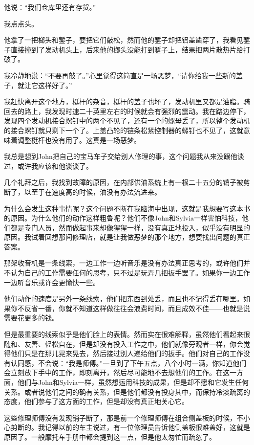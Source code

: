 \documentclass[UTF8]{article}
\begin{document}
\par 他说：“我们仓库里还有存货。”
\par 我点点头。
\par 他拿了一把榔头和錾子，要把它们敲松，然而他的錾子却把铝盖凿穿了，我看见錾子直接撞到了发动机头上，后来他的榔头没能打到錾子上，结果把两片散热片给打破了。
\par 我冷静地说：“不要再敲了。”心里觉得这简直是一场恶梦，“请你给我一些新的盖子，就让它这样好了。”
\par 我赶快离开这个地方，梃杆的杂音，梃杆的盖子也坏了，发动机里又都是油脂。骑回去的路上，我发现时速二十英里左右的时候就会有强烈的震动。我在路边停下，发现四个发动机接合螺钉中的两个不见了，还有一个的螺母丢了，所以整个发动机的接合螺钉就只剩下一个了。上盖凸轮的链条松紧控制器的螺钉也不见了，这就意味着调整梃杆也没有用了。这真是一场恶梦。
\par 我总是想到John把自己的宝马车子交给别人修理的事，这个问题我从来没跟他谈过，或许我应该和他谈谈了。
\par 几个礼拜之后，我找到故障的原因，在内部供油系统上有一根二十五分的销子被剪断了，以至于在速度高的时候，油没有办法流进来。
\par 为什么会发生这种事情呢？这个问题不断在我脑海中出现，这就是我想要写这本书的原因。为什么他们的动作这样粗鲁呢？他们不像John和Sylvia一样害怕科技，他们都是专门人员，然而做起事来却像猩猩一样，没有真正地投入，似乎没有明显的原因。我试着回想那间修理店，就是让我做恶梦的那个地方，想要找出问题的真正答案。
\par 那架收音机是一条线索，一边工作一边听音乐是没有办法真正思考的，或许他们并不认为自己的工作需要任何的思考，只不过是玩弄几把扳手罢了。如果你一边工作一边听音乐或许会更愉快一些。
\par 他们动作的速度是另外一条线索，他们把东西到处丢，而且也不记得丢在哪里。如果你不反省一番，你就不知道这样做往往会浪费时间，而且成效不佳——也就是说需要花更多的钱。
\par 但是最重要的线索似乎是他们脸上的表情。然而实在很难解释，虽然他们看起来很随和、友善、轻松自在，但是却没有投入工作之中，他们就像旁观者一样，你会觉得他们只是在那儿晃来晃去，然后接过别人递给他们的扳手。他们对自己的工作没有认同感，不会说：“我是师傅。”一旦到了下午五点，八个小时一满，你知道他们会立刻放下手中的工作，即刻离开，然后尽可能地不去想他们的工作。在这一方面，他们与John和Sylvia一样，虽然想运用科技的成果，但是却不愿和它发生任何关系。或者说他们之间的确有关系，但是他们都没有投身其中，而保持冷淡疏离的态度，他们参与了这方面的工作，但是却没有真正地关心它。
\par 这些修理师傅没有发现销子断了，那是前一个修理师傅在组合侧盖板的时候，不小心剪断的。我记得以前的车主说过，有一位修理员告诉他侧盖板很难盖好，这就是原因了。一般摩托车手册中都会提到这一点，但是他太匆忙而疏忽了。
\end{document}
